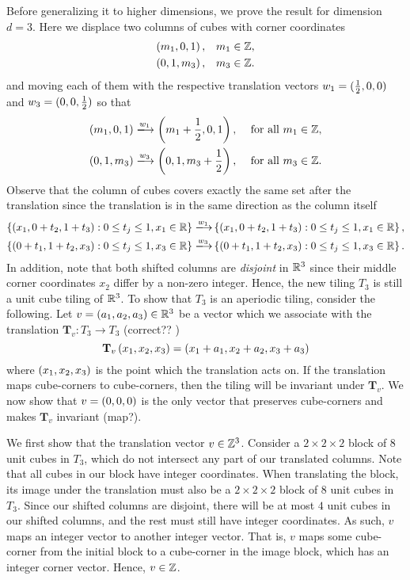 \documentclass[../thesis.tex]{subfiles}
\begin{document}
Before generalizing it to higher dimensions, we prove the result for dimension $d=3$. Here we displace two columns of cubes with corner coordinates 
\begin{align*}
    \left(m_1,0,1\right),& \quad m_1 \in \mathbb{Z},\\
    \left(0,1,m_3\right),& \quad m_3 \in \mathbb{Z}.
\end{align*}
and moving each of them with the respective translation vectors $w_1 = (\frac{1}{2},0,0)$ and $w_3 = (0,0,\frac{1}{2})$ so that
\begin{align*}
    \bracMed{m_1,0,1} \xlongrightarrow[]{w_1} \bracMed{m_1 + \frac{1}{2} ,0,1}, \quad  &\text{ for all } m_1 \in \Z,\\
    \bracMed{0,1,m_3} \xlongrightarrow[]{w_3} \bracMed{0,1,m_3+\frac{1}{2}},    \quad  &\text{ for all }  m_3 \in \Z.
\end{align*}
Observe that the column of cubes covers exactly the same set after the translation since the translation is in the same direction as the column itself 
\begin{align*}
    \braqMed{ \bracMed{x_1, 0+t_2,1+t_3} : 0 \leq t_j \leq 1, x_1\in\R} \xlongrightarrow[]{w_1} & \braqMed{ \bracMed{x_1, 0+t_2,1+t_3} : 0 \leq t_j \leq 1, x_1\in\R},\\
    \braqMed{ \bracMed{0+t_1,1+t_2,x_3} : 0 \leq t_j \leq 1, x_3\in\R} \xlongrightarrow[]{w_3} & \braqMed{ \bracMed{0+t_1,1+t_2,x_3} : 0 \leq t_j \leq 1, x_3\in\R}.
\end{align*}
In addition, note that both shifted columns are \emph{disjoint} in $\mathbb{R}^3$ since their middle corner coordinates $x_2$ differ by a non-zero integer. Hence, the new tiling $T_3$ is still a unit cube tiling of $\mathbb{R}^3$. To show that $T_3$ is an aperiodic tiling, consider the following. Let $v=(a_1,a_2,a_3)\in \mathbb{R}^3$ be a vector which we associate with the translation $\mathbf{T}_v:T_3 \rightarrow T_3$ (correct?? )
\begin{equation*}
    \mathbf{T}_v \left(x_1,x_2,x_3\right) = \left(x_1+a_1, x_2+a_2, x_3+a_3\right) 
\end{equation*}
where $(x_1,x_2,x_3)$ is the point which the translation acts on. If the translation maps cube-corners to cube-corners, then the tiling will be invariant under $\mathbf{T}_v$. We now show that $v=(0,0,0)$ is the only vector that preserves cube-corners and makes $\mathbf{T}_v$ invariant (map?). 

We first show that the translation vector $v\in \mathbb{Z}^3$. Consider a $2\times 2\times 2$ block of $8$ unit cubes in $T_3$, which do not intersect any part of our translated columns. Note that all cubes in our block have integer coordinates. When translating the block, its image under the translation must also be a $2\times 2\times 2$ block of $8$ unit cubes in $T_3$. Since our shifted columns are disjoint, there will be at most $4$ unit cubes in our shifted columns, and the rest must still have integer coordinates. As such, $v$ maps an integer vector to another integer vector. That is, $v$ maps some cube-corner from the initial block to a cube-corner in the image block, which has an integer corner vector. Hence, $v\in \mathbb{Z}$. 
\end{document}

